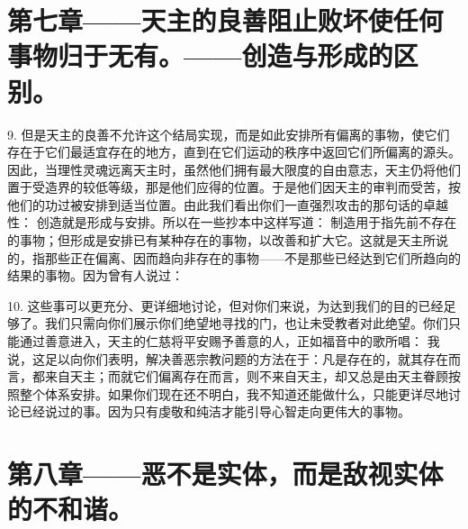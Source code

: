 
\section{第七章——天主的良善阻止败坏使任何事物归于无有。——创造与形成的区别。}

9. 但是天主的良善不允许这个结局实现，而是如此安排所有偏离的事物，使它们存在于它们最适宜存在的地方，直到在它们运动的秩序中返回它们所偏离的源头。因此，当理性灵魂远离天主时，虽然他们拥有最大限度的自由意志，天主仍将他们置于受造界的较低等级，那是他们应得的位置。于是他们因天主的审判而受苦，按他们的功过被安排到适当位置。由此我们看出你们一直强烈攻击的那句话的卓越性： 创造就是形成与安排。所以在一些抄本中这样写道： 制造用于指先前不存在的事物；但形成是安排已有某种存在的事物，以改善和扩大它。这就是天主所说的，指那些正在偏离、因而趋向非存在的事物——不是那些已经达到它们所趋向的结果的事物。因为曾有人说过：\par

10. 这些事可以更充分、更详细地讨论，但对你们来说，为达到我们的目的已经足够了。我们只需向你们展示你们绝望地寻找的门，也让未受教者对此绝望。你们只能通过善意进入，天主的仁慈将平安赐予善意的人，正如福音中的歌所唱： 我说，这足以向你们表明，解决善恶宗教问题的方法在于：凡是存在的，就其存在而言，都来自天主；而就它们偏离存在而言，则不来自天主，却又总是由天主眷顾按照整个体系安排。如果你们现在还不明白，我不知道还能做什么，只能更详尽地讨论已经说过的事。因为只有虔敬和纯洁才能引导心智走向更伟大的事物。\par


\section{第八章——恶不是实体，而是敌视实体的不和谐。}

